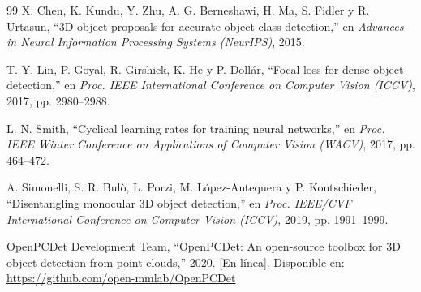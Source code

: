 \documentclass[11pt,letterpaper]{article}
\begin{document}
\begin{thebibliography}{99}
X. Chen, K. Kundu, Y. Zhu, A. G. Berneshawi, H. Ma, S. Fidler y R. Urtasun, ``3D object proposals for accurate object class detection,'' en \emph{Advances in Neural Information Processing Systems (NeurIPS)}, 2015.

T.-Y. Lin, P. Goyal, R. Girshick, K. He y P. Dollár, ``Focal loss for dense object detection,'' en \emph{Proc. IEEE International Conference on Computer Vision (ICCV)}, 2017, pp. 2980--2988.

L. N. Smith, ``Cyclical learning rates for training neural networks,'' en \emph{Proc. IEEE Winter Conference on Applications of Computer Vision (WACV)}, 2017, pp. 464--472.

A. Simonelli, S. R. Bulò, L. Porzi, M. López-Antequera y P. Kontschieder, ``Disentangling monocular 3D object detection,'' en \emph{Proc. IEEE/CVF International Conference on Computer Vision (ICCV)}, 2019, pp. 1991--1999.

OpenPCDet Development Team, ``OpenPCDet: An open-source toolbox for 3D object detection from point clouds,'' 2020. [En línea]. Disponible en: \url{https://github.com/open-mmlab/OpenPCDet}

\end{thebibliography}
\end{document}
